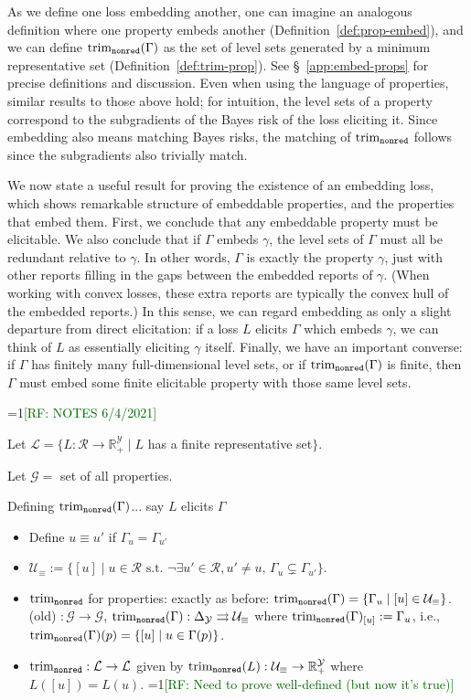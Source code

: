 \documentclass[11pt]{article}
\newcommand{\Comments}{1}
\newcommand{\mynote}[2]{\ifnum\Comments=1\textcolor{#1}{#2}\fi}
\newcommand{\raf}[1]{\mynote{darkgreen}{[RF: #1]}}
\newcommand{\reals}{\mathbb{R}}
\newcommand{\simplex}{\Delta_\Y}
\renewcommand{\L}{\mathcal{L}}
\newcommand{\R}{\mathcal{R}}
\newcommand{\U}{\mathcal{U}}
\newcommand{\Y}{\mathcal{Y}}
\newcommand{\toto}{\rightrightarrows}
\newcommand{\trimnonred}{\mathrm{trim}_{{\tt nonred}}}
\begin{document}
As we define one loss embedding another, one can imagine an analogous definition where one property embeds another (Definition~\ref{def:prop-embed}), and we can define $\trimnonred(\Gamma)$ as the set of level sets generated by a minimum representative set (Definition~\ref{def:trim-prop}).
See \S~\ref{app:embed-props} for precise definitions and discussion.
Even when using the language of properties, similar results to those above hold; for intuition, the level sets of a property correspond to the subgradients of the Bayes risk of the loss eliciting it.
Since embedding also means matching Bayes risks, the matching of $\trimnonred$ follows since the subgradients also trivially match.

We now state a useful result for proving the existence of an embedding loss, which shows remarkable structure of embeddable properties, and the properties that embed them.
First, we conclude that any embeddable property must be elicitable.
We also conclude that if $\Gamma$ embeds $\gamma$, the level sets of $\Gamma$ must all be redundant relative to $\gamma$.
In other words, $\Gamma$ is exactly the property $\gamma$, just with other reports filling in the gaps between the embedded reports of $\gamma$.
(When working with convex losses, these extra reports are typically the convex hull of the embedded reports.)
In this sense, we can regard embedding as only a slight departure from direct elicitation: if a loss $L$ elicits $\Gamma$ which embeds $\gamma$, we can think of $L$ as essentially eliciting $\gamma$ itself.
Finally, we have an important converse: if $\Gamma$ has finitely many full-dimensional level sets, or if $\trimnonred(\Gamma)$ is finite, then $\Gamma$ must embed some finite elicitable property with those same level sets.

\raf{NOTES 6/4/2021}

Let $\L = \{ L:\R\to\reals^\Y_+ \mid L$ has a finite representative set$\}$.

Let $\mathcal{G} =$ set of all properties.

Defining $\trimnonred(\Gamma)$... say $L$ elicits $\Gamma$
\begin{itemize}
\item Define $u \equiv u'$ if $\Gamma_u = \Gamma_{u'}$
\item $\U_\equiv := \{[u] \mid u \in \R \textrm{ s.t. } \neg\exists u'\in\R,u'\neq u,\, \Gamma_u \subsetneq \Gamma_{u'}\}$.
\item $\trimnonred$ for properties: exactly as before: $\trimnonred(\Gamma) = \{\Gamma_u \mid [u] \in \U_\equiv\}$. 
  (old) $:\mathcal{G}\to\mathcal{G}$, $\trimnonred(\Gamma):\simplex \toto \U_\equiv$ where $\trimnonred(\Gamma)_{[u]} := \Gamma_u$, i.e., $\trimnonred(\Gamma)(p) = \{[u] \mid u \in \Gamma(p)\}$. 
\item $\trimnonred:\L \to \L$ given by $\trimnonred(L):\U_\equiv\to\reals^\Y_+$ where $L([u]) = L(u)$.  \raf{Need to prove well-defined (but now it's true)}
\end{itemize} 
\end{document}

